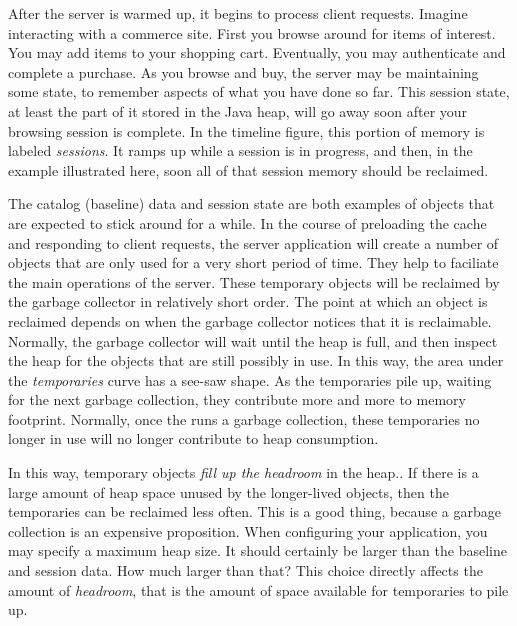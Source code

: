 After the server is warmed up, it begins to process client requests. Imagine
interacting with a commerce site. First you browse around for items of
interest. You may add items to your shopping cart. Eventually, you may
authenticate and complete a purchase. 
As you browse and buy, the server may be maintaining some
state, to remember aspects of what you have done so far. This
session state, at least the part of it stored in the Java heap, will go away
soon after your browsing session is complete. In the timeline figure, this
portion of memory is labeled \emph{sessions}. It ramps up while a session is in
progress, and then, in the example illustrated here, soon all of that session
memory should be reclaimed.

The catalog (baseline) data and session state are both examples of objects that
are expected to stick around for a while.
 In the course of preloading the cache
and responding to client requests, the server application will create a number
of objects that are only used for a very short period of time. They help to
faciliate the main operations of the server.
These temporary objects will be reclaimed by the \jres garbage collector in
relatively short order. The point at which an object is reclaimed depends on when the garbage collector
notices that it is reclaimable. Normally, the garbage collector will wait until
the heap is full, and then inspect the heap for the objects that are still
possibly in use. In this way, the area under the \emph{temporaries} curve has a
see-saw shape. As the temporaries pile up, waiting for the next garbage
collection, they contribute more and more to memory footprint. Normally, once
the \jre runs a garbage collection, these temporaries no longer in use will no
longer contribute to heap consumption.

In this way, temporary objects
\emph{fill up the headroom} in the heap.. If there is a
large amount of heap space unused by the longer-lived objects, then the
temporaries can be reclaimed less often. This is a good thing, because a
garbage collection is an expensive proposition.
 
When configuring your application, you may specify a maximum heap size. It
should certainly be larger than the baseline and session data. How much
larger than that? This choice directly affects the amount of \emph{headroom},
 that is the amount of space available for temporaries to pile up.

